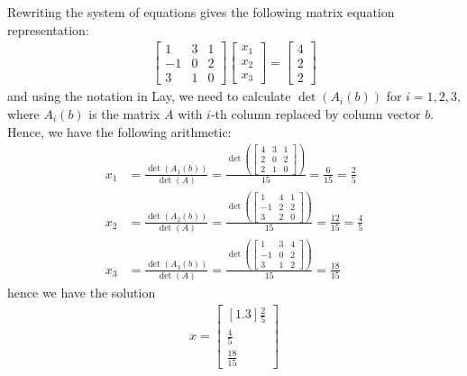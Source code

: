 \documentclass{amsart}
\theoremstyle{definition}
\theoremstyle{definition}
\DeclareMathOperator{\1}{\mathbbm{1}}
\begin{document}
\begin{enumerate}[itemsep = 2mm]
		Rewriting the system of equations gives the following matrix equation representation:
		\begin{align*}
		\begin{bmatrix}
		1 & 3 & 1 \\ -1 & 0 & 2 \\ 3 & 1 & 0
		\end{bmatrix} \begin{bmatrix}
		x_1 \\ x_2 \\ x_3
		\end{bmatrix} = \begin{bmatrix}
		4 \\ 2 \\ 2
		\end{bmatrix}
		\end{align*}
		and using the notation in Lay, we need to calculate $\det(A_i (b))$ for $i=1,2,3$, where $A_i (b)$ is the matrix $A$ with $i$-th column replaced by column vector $b$. Hence, we have the following arithmetic:
		\begin{align*}
		x_1 &= \frac{\det(A_1 (b))}{\det (A)} = \frac{\det \left( \begin{bmatrix}
			4 & 3 & 1 \\ 2 & 0 & 2 \\ 2 & 1 & 0
			\end{bmatrix} \right) }{15} = \frac{6}{15} = \frac{2}{5} \\
		x_2 &= \frac{\det(A_2 (b))}{\det(A)} = \frac{\det \left( \begin{bmatrix}
			1 & 4 & 1 \\ -1 & 2 & 2 \\ 3 & 2 & 0
			\end{bmatrix} \right) }{15} = \frac{12}{15} = \frac{4}{5} \\
		x_3 &= \frac{\det(A_3 (b))}{\det (A)} = \frac{\det \left( \begin{bmatrix}
			1 & 3 & 4 \\ -1 & 0 & 2 \\ 3 & 1 & 2
			\end{bmatrix} \right)}{15} = \frac{18}{15}
		\end{align*}
		hence we have the solution
		\begin{align*}
		x = \begin{bmatrix}[1.3]
		\frac{2}{5}  \\ \frac{4}{5}  \\ \frac{18}{15} 
		\end{bmatrix}
		\end{align*}
		

\end{enumerate}
\end{document}
